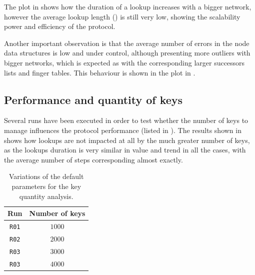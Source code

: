 \documentclass[11pt,twocolumn,letterpaper]{article}
\begin{document}
	The plot in  shows how the duration of a lookup increases with a bigger network, however the average lookup length () is still very low, showing the scalability power and efficiency of the protocol.
	
	Another important observation is that the average number of errors in the node data structures is low and under control, although presenting more outliers with bigger networks, which is expected as with the corresponding larger successors lists and finger tables. This behaviour is shown in the plot in .

	
	\subsection{Performance and quantity of keys}
	\label{subsec:keyno_analysis}
	Several runs have been executed in order to test whether the number of keys to manage influences the protocol performance (listed in ). The results shown in  shows how lookups are not impacted at all by the much greater number of keys, as the lookups duration is very similar in value and trend in all the cases, with the average number of steps corresponding almost exactly.
	\begin{table}[t]
		\caption{Variations of the default parameters for the key quantity analysis.}
		\label{tab:keyno_runs}
		\centering
		\begin{tabular}{cc}
			\hline
			\textbf{Run} & \textbf{Number of keys}\\
			\hline
			\texttt{R01} & $1000$\\
			\hline
			\texttt{R02} & $2000$\\
			\hline
			\texttt{R03} & $3000$\\
			\hline
			\texttt{R03} & $4000$\\
			\hline
		\end{tabular}
	\end{table}		
\end{document}
